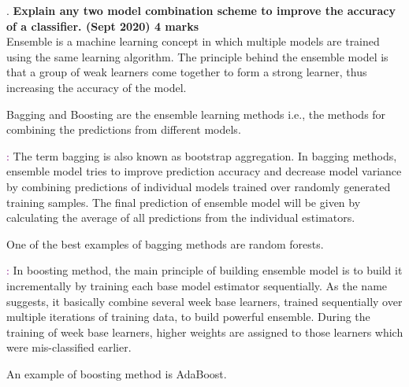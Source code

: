 . 
\textbf{\textcolor{LightMagenta}{Explain  any  two  model  combination  scheme  to  improve  the  accuracy  of  a classifier. (Sept 2020) \hfill 4 marks}} \\[5pt]
Ensemble is a machine learning concept in which multiple models are trained using the same learning algorithm.
The principle behind the ensemble model is that a group of weak learners come together to form a strong learner, thus increasing the accuracy of the model. 

Bagging and Boosting are the ensemble learning methods i.e., the methods for combining the predictions from different models.

\textcolor{purple}{\underline{}:} 
The term bagging is also known as bootstrap aggregation. In bagging methods, ensemble model tries to improve prediction accuracy and decrease model variance by combining predictions of individual models trained over randomly generated training samples. The final prediction of ensemble model will be given by calculating the average of all predictions from the individual estimators.

One of the best examples of bagging methods are random forests.

\textcolor{purple}{\underline{}:}
In boosting method, the main principle of building ensemble model is to build it incrementally by training each base model estimator sequentially. As the name suggests, it basically combine several week base learners, trained sequentially over multiple iterations of training data, to build powerful ensemble. During the training of week base learners, higher weights are assigned to those learners which were mis-classified earlier.

An example of boosting method is AdaBoost. 